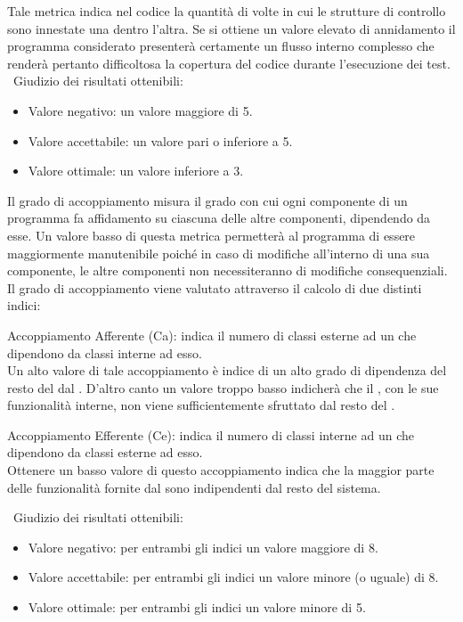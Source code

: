\documentclass[a4paper, titlepage]{article}
\begin{document}
Tale metrica indica nel codice la quantità di volte in cui le strutture di controllo sono innestate una dentro l’altra. Se si ottiene un valore elevato di annidamento il programma considerato presenterà certamente un flusso interno complesso che renderà pertanto difficoltosa la copertura del codice durante l'esecuzione dei test. 
\
\newline Giudizio dei risultati ottenibili:
\begin{itemize}
\item Valore negativo: un valore maggiore di 5.  
\item Valore accettabile: un valore pari o inferiore a 5.
\item Valore ottimale: un valore inferiore a 3.
\end{itemize}

Il grado di accoppiamento misura il grado con cui ogni componente di un programma fa affidamento su ciascuna delle altre componenti, dipendendo da esse.
Un valore basso di questa metrica permetterà al programma di essere maggiormente manutenibile poiché in caso di modifiche all'interno di una sua componente, le altre componenti non necessiteranno di modifiche consequenziali.
\\ Il grado di accoppiamento viene valutato attraverso il calcolo di due distinti indici:
\begin{description}
\item{ Accoppiamento Afferente (Ca):} indica il numero di classi esterne ad un  che dipendono da classi interne ad esso. 
\\ Un alto valore di tale accoppiamento è indice di un alto grado di dipendenza del resto del \gl{software} dal . D'altro canto un valore troppo basso indicherà che il \gl{package}, con le sue funzionalità interne, non viene sufficientemente sfruttato dal resto del .
\item{Accoppiamento Efferente (Ce):} indica il numero di classi interne ad un  che dipendono da classi esterne ad esso. 
\\Ottenere un basso valore di questo accoppiamento indica che la maggior parte delle funzionalità fornite dal \gl{package} sono indipendenti dal resto del sistema.
\end{description}
\
\newline Giudizio dei risultati ottenibili:
\begin{itemize}
\item Valore negativo: per entrambi gli indici un valore maggiore di 8.   
\item Valore accettabile: per entrambi gli indici un valore minore (o uguale) di 8.
\item Valore ottimale: per entrambi gli indici un valore minore di 5.
\end{itemize}
\end{document}
